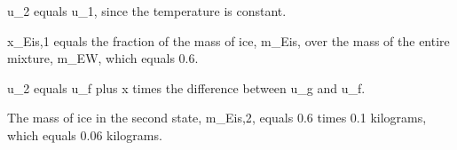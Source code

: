 u_2 equals u_1, since the temperature is constant.

x_{Eis,1} equals the fraction of the mass of ice, m_{Eis}, over the mass of the entire mixture, m_{EW}, which equals 0.6.

u_2 equals u_f plus x times the difference between u_g and u_f.

The mass of ice in the second state, m_{Eis,2}, equals 0.6 times 0.1 kilograms, which equals 0.06 kilograms.